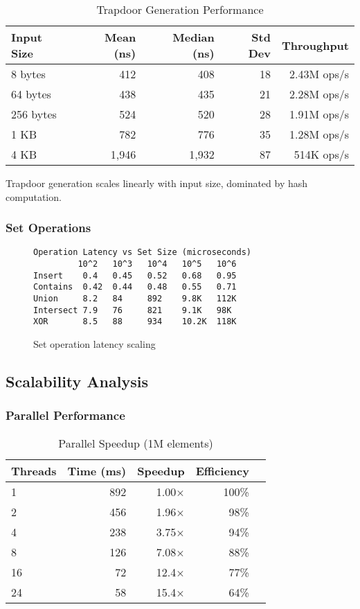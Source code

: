 \documentclass[../main_comprehensive.tex]{subfiles}
\begin{document}
\begin{table}[h]
\centering
\caption{Trapdoor Generation Performance}
\begin{tabular}{lrrrr}
\toprule
Input Size & Mean (ns) & Median (ns) & Std Dev & Throughput \\
\midrule
8 bytes & 412 & 408 & 18 & 2.43M ops/s \\
64 bytes & 438 & 435 & 21 & 2.28M ops/s \\
256 bytes & 524 & 520 & 28 & 1.91M ops/s \\
1 KB & 782 & 776 & 35 & 1.28M ops/s \\
4 KB & 1,946 & 1,932 & 87 & 514K ops/s \\
\bottomrule
\end{tabular}
\end{table}

Trapdoor generation scales linearly with input size, dominated by hash computation.

\subsubsection{Set Operations}

\begin{figure}[h]
\centering
\begin{lstlisting}[language={},basicstyle=\scriptsize\ttfamily,frame=single]
Operation Latency vs Set Size (microseconds)
         10^2   10^3   10^4   10^5   10^6
Insert    0.4   0.45   0.52   0.68   0.95
Contains  0.42  0.44   0.48   0.55   0.71
Union     8.2   84     892    9.8K   112K
Intersect 7.9   76     821    9.1K   98K
XOR       8.5   88     934    10.2K  118K
\end{lstlisting}
\caption{Set operation latency scaling}
\label{fig:set_ops}
\end{figure}

\subsection{Scalability Analysis}

\subsubsection{Parallel Performance}

\begin{table}[h]
\centering
\caption{Parallel Speedup (1M elements)}
\begin{tabular}{lrrrr}
\toprule
Threads & Time (ms) & Speedup & Efficiency \\
\midrule
1 & 892 & 1.00× & 100\% \\
2 & 456 & 1.96× & 98\% \\
4 & 238 & 3.75× & 94\% \\
8 & 126 & 7.08× & 88\% \\
16 & 72 & 12.4× & 77\% \\
24 & 58 & 15.4× & 64\% \\
\bottomrule
\end{tabular}
\end{table}
\end{document}

